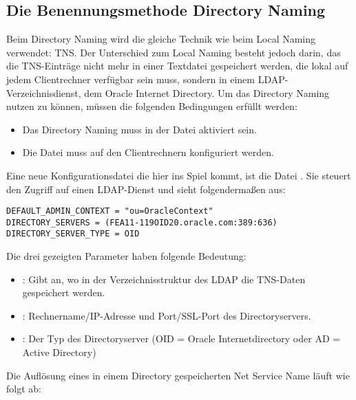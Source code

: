       \subsection{Die Benennungsmethode Directory Naming}
        Beim Directory Naming wird die gleiche Technik wie beim Local Naming verwendet: TNS. Der Unterschied zum Local Naming besteht jedoch darin, das die TNS-Einträge nicht mehr in einer Textdatei gespeichert werden, die lokal auf jedem Clientrechner verfügbar sein muss, sondern in einem LDAP-Verzeichnisdienst, dem Oracle Internet Directory.
\clearpage
        Um das Directory Naming nutzen zu können, müssen die folgenden Bedingungen erfüllt werden:
        \begin{itemize}
          \item Das Directory Naming muss in der Datei  aktiviert sein.
          \item Die Datei  muss auf den Clientrechnern konfiguriert werden.
        \end{itemize}
        Eine neue Konfigurationsdatei die hier ins Spiel kommt, ist die Datei . Sie steuert den Zugriff auf einen LDAP-Dienst und sieht folgendermaßen aus:
        \begin{lstlisting}[caption={Die Datei ldap.ora},label=admin612,language=configfile]
DEFAULT_ADMIN_CONTEXT = "ou=OracleContext"
DIRECTORY_SERVERS = (FEA11-119OID20.oracle.com:389:636)
DIRECTORY_SERVER_TYPE = OID
        \end{lstlisting}
        Die drei gezeigten Parameter haben folgende Bedeutung:
        \begin{itemize}
          \item {}: Gibt an, wo in der Verzeichnisstruktur des LDAP die TNS-Daten gespeichert werden.
          \item {}: Rechnername/IP-Adresse und Port/SSL-Port des Directoryservers.
          \item {}: Der Typ des Directoryserver (OID = Oracle Internetdirectory oder AD = Active Directory)
        \end{itemize}

        Die Auflösung eines in einem Directory gespeicherten Net Service Name läuft wie folgt ab:


